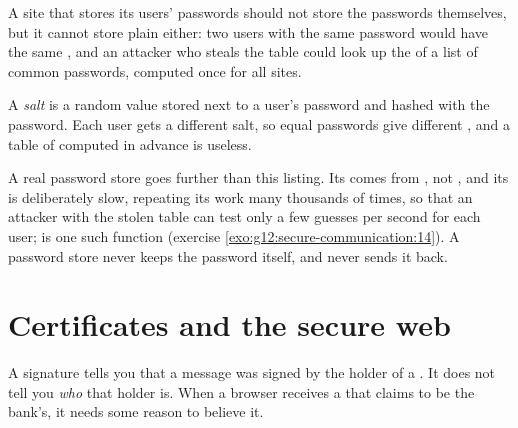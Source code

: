 A site that stores its users' passwords should not store the passwords themselves, but it cannot store plain 
either: two users with the same password would have the same , and an attacker who steals the table could look
up the  of a list of common passwords, computed once for all sites.

\begin{definition}[Salt]\label{def:g12:secure-communication:salt}
A \emph{salt} is a random value stored next to a user's password  and hashed with the password.
Each user gets a different salt, so equal passwords give different , and a table of  computed in
advance is useless.
\end{definition}

\label{lst:g12:secure-communication:salted}

\label{out:g12:secure-communication:salted}

\begin{safety}
A real password store goes further than this listing. Its  comes from , not , and its
 is deliberately slow, repeating its work many thousands of times, so that an attacker with the stolen
table can test only a few guesses per second for each user;  is one such function
(exercise \ref{exo:g12:secure-communication:14}). A password store never keeps the password itself, and never sends
it back.
\end{safety}

\section{Certificates and the secure web}\label{sec:g12:secure-communication:https}

A signature tells you that a message was signed by the holder of a . It does not tell you \emph{who} that
holder is. When a browser receives a  that claims to be the bank's, it needs some reason to believe it.

